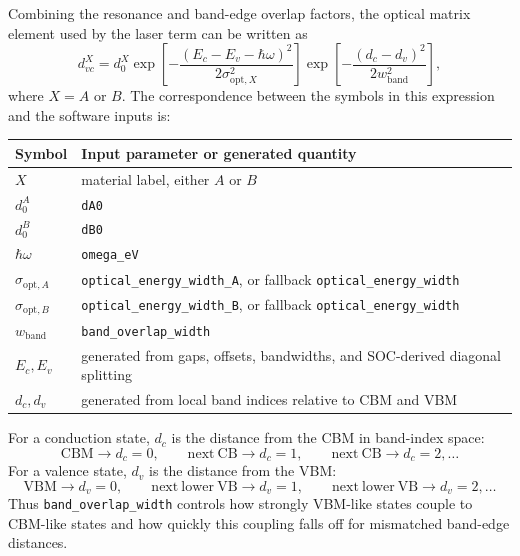 \documentclass[11pt,a4paper]{article}
\begin{document}
Combining the resonance and band-edge overlap factors, the optical matrix element used by the laser term can be written as
\begin{equation}
d^X_{vc}
=
d^X_0
\exp\left[
-\frac{(E_c-E_v-\hbar\omega)^2}{2\sigma_{\mathrm{opt},X}^2}
\right]
\exp\left[
-\frac{(d_c-d_v)^2}{2w_{\mathrm{band}}^2}
\right],
\end{equation}
where $X=A$ or $B$.  The correspondence between the symbols in this expression and the software inputs is:
\begin{center}
\begin{tabular}{ll}
\toprule
Symbol & Input parameter or generated quantity \\
\midrule
$X$ & material label, either $A$ or $B$ \\
$d^A_0$ & \texttt{dA0} \\
$d^B_0$ & \texttt{dB0} \\
$\hbar\omega$ & \texttt{omega\_eV} \\
$\sigma_{\mathrm{opt},A}$ & \texttt{optical\_energy\_width\_A}, or fallback \texttt{optical\_energy\_width} \\
$\sigma_{\mathrm{opt},B}$ & \texttt{optical\_energy\_width\_B}, or fallback \texttt{optical\_energy\_width} \\
$w_{\mathrm{band}}$ & \texttt{band\_overlap\_width} \\
$E_c,E_v$ & generated from gaps, offsets, bandwidths, and SOC-derived diagonal splitting \\
$d_c,d_v$ & generated from local band indices relative to CBM and VBM \\
\bottomrule
\end{tabular}
\end{center}

For a conduction state, $d_c$ is the distance from the CBM in band-index space:
\begin{equation}
\mathrm{CBM}\rightarrow d_c=0,\qquad
\mathrm{next\ CB}\rightarrow d_c=1,\qquad
\mathrm{next\ CB}\rightarrow d_c=2,\ldots
\end{equation}
For a valence state, $d_v$ is the distance from the VBM:
\begin{equation}
\mathrm{VBM}\rightarrow d_v=0,\qquad
\mathrm{next\ lower\ VB}\rightarrow d_v=1,\qquad
\mathrm{next\ lower\ VB}\rightarrow d_v=2,\ldots
\end{equation}
Thus \texttt{band\_overlap\_width} controls how strongly VBM-like states couple to CBM-like states and how quickly this coupling falls off for mismatched band-edge distances.
\end{document}
